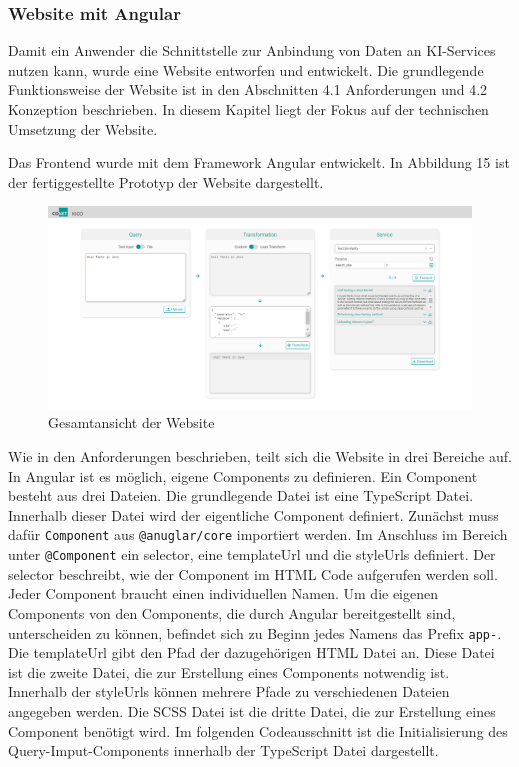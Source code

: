 \subsubsection{Website mit Angular}
Damit ein Anwender die Schnittstelle zur Anbindung von Daten an KI-Services nutzen kann, wurde eine Website entworfen und entwickelt. Die grundlegende Funktionsweise der Website ist in den Abschnitten 4.1 Anforderungen und 4.2 Konzeption beschrieben. In diesem Kapitel liegt der Fokus auf der technischen Umsetzung der Website. 

Das Frontend wurde mit dem Framework Angular entwickelt. In Abbildung 15 ist der fertiggestellte Prototyp der Website dargestellt. 

\begin{figure}[H]
  \centering
    \includegraphics[width = 15cm]{bilder/website}
    \caption{Gesamtansicht der Website}
\end{figure}

Wie in den Anforderungen beschrieben, teilt sich die Website in drei Bereiche auf. In Angular ist es möglich, eigene Components zu definieren. Ein Component besteht aus drei Dateien. Die grundlegende Datei ist eine TypeScript Datei. Innerhalb dieser Datei wird der eigentliche Component definiert. Zunächst muss dafür \texttt{Component} aus \texttt{@anuglar/core} importiert werden. Im Anschluss im Bereich unter \texttt{@Component} ein selector, eine templateUrl und die styleUrls definiert. Der selector beschreibt, wie der Component im HTML Code aufgerufen werden soll. Jeder Component braucht einen individuellen Namen. Um die eigenen Components von den Components, die durch Angular bereitgestellt sind, unterscheiden zu können, befindet sich zu Beginn jedes Namens das Prefix \texttt{app-}. Die templateUrl gibt den Pfad der dazugehörigen HTML Datei an. Diese Datei ist die zweite Datei, die zur Erstellung eines Components notwendig ist. Innerhalb der styleUrls können mehrere Pfade zu verschiedenen Dateien angegeben werden. Die SCSS Datei ist die dritte Datei, die zur Erstellung eines Component benötigt wird. Im folgenden Codeausschnitt ist die Initialisierung des Query-Imput-Components innerhalb der TypeScript Datei dargestellt.


